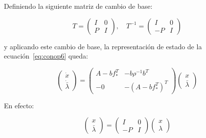         Definiendo la siguiente matriz de cambio de base:

        \begin{equation}
            T =
            \begin{pmatrix}
                I & 0 \\
                P & I
            \end{pmatrix}, \quad T^{-1} =
            \begin{pmatrix}
                I & 0 \\
                -P & I
            \end{pmatrix}
        \end{equation}

        y aplicando este cambio de base, la representación de estado de la ecuación~\ref{eq:conop6} queda:

        \begin{equation} \label{eq:conop10}
            \begin{pmatrix}
                \dot{x} \\
                \dot{\bar{\lambda}}
            \end{pmatrix} =
            \begin{pmatrix}
                A - b f_*^T & -b \rho^{-1} b^T \\
                -0 & - (A - b f_*^T)^T
            \end{pmatrix}
            \begin{pmatrix}
                x \\
                \bar{\lambda}
            \end{pmatrix}
        \end{equation}

        En efecto:

        \begin{equation*}
            \begin{pmatrix}
                x \\
                \bar{\lambda}
            \end{pmatrix} =
            \begin{pmatrix}
                I & 0 \\
                -P & I
            \end{pmatrix}
            \begin{pmatrix}
                x \\
                \lambda
            \end{pmatrix}
        \end{equation*}

